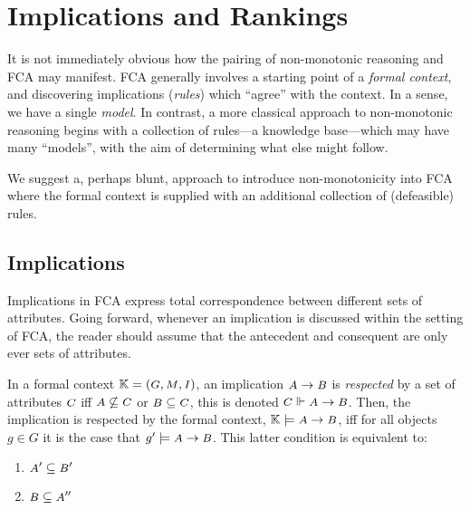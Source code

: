 \section{Implications and Rankings}
\label{Section: Impl}
It is not immediately obvious how the pairing of non-monotonic reasoning and FCA may manifest. FCA generally involves a starting point of a \textit{formal context}, and discovering implications (\textit{rules}) which ``agree'' with the context. In a sense, we have a single \textit{model}. In contrast, a more classical approach to non-monotonic reasoning begins with a collection of rules—a knowledge base—which may have many  ``models'', with the aim of determining what else might follow.

We suggest a, perhaps blunt, approach to introduce non-monotonicity into FCA where the formal context is supplied with an additional collection of (defeasible) rules.

\subsection{Implications}
\label{subsec: Implications}
Implications in FCA express total correspondence between different sets of attributes. Going forward, whenever an implication is discussed within the setting of FCA, the reader should assume that the antecedent and consequent are only ever sets of attributes.

\begin{definition}
    \label{definition: fca-implication semantics}
    In a formal context $\FC$, an implication $\A \rightarrow \B$ is \textit{respected} by a set of attributes $\C$ iff $\A \not\subseteq \C$ or $\B \subseteq \C$, this is denoted $\C \Vdash \A \rightarrow \B$. Then, the implication is respected by the formal context, $\K \models \A \rightarrow \B$, iff for all objects $g \in G$ it is the case that $g' \models \A \rightarrow \B$. This latter condition is equivalent to:
    \begin{flushleft}
        \begin{enumerate}[label=(\roman*)]
            \item \centering $\A' \subseteq \B'$
            \item \centering $\B \subseteq \A''$
        \end{enumerate}
    \end{flushleft}
\end{definition}

